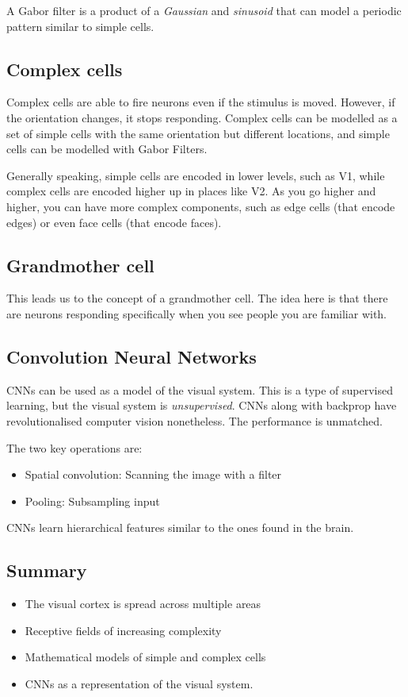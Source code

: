 \documentclass[11pt,a4paper,titlepage,dvipsnames,cmyk]{scrartcl}
\begin{document}
A Gabor filter is a product of a \textit{Gaussian} and \textit{sinusoid} that can model a periodic pattern similar to simple cells. 

\subsection{Complex cells}
Complex cells are able to fire neurons even if the stimulus is moved. However, if the orientation changes, it stops responding. Complex cells can be modelled as a set of simple cells with the same orientation but different locations, and simple cells can be modelled with Gabor Filters.

Generally speaking, simple cells are encoded in lower levels, such as V1, while complex cells are encoded higher up in places like V2. As you go higher and higher, you can have more complex components, such as edge cells (that encode edges) or even face cells (that encode faces).

\subsection{Grandmother cell}
This leads us to the concept of a grandmother cell. The idea here is that there are neurons responding specifically when you see people you are familiar with.

\subsection{Convolution Neural Networks}
CNNs can be used as a model of the visual system. This is a type of supervised learning, but the visual system is \textit{unsupervised}. CNNs along with backprop have revolutionalised computer vision nonetheless. The performance is unmatched.

The two key operations are:
\begin{itemize}
    \item Spatial convolution: Scanning the image with a filter
    \item Pooling: Subsampling input 
\end{itemize}

CNNs learn hierarchical features similar to the ones found in the brain.

\subsection{Summary}
\begin{itemize}
    \item The visual cortex is spread across multiple areas
    \item Receptive fields of increasing complexity
    \item Mathematical models of simple and complex cells
    \item CNNs as a representation of the visual system.
\end{itemize}
\end{document}
